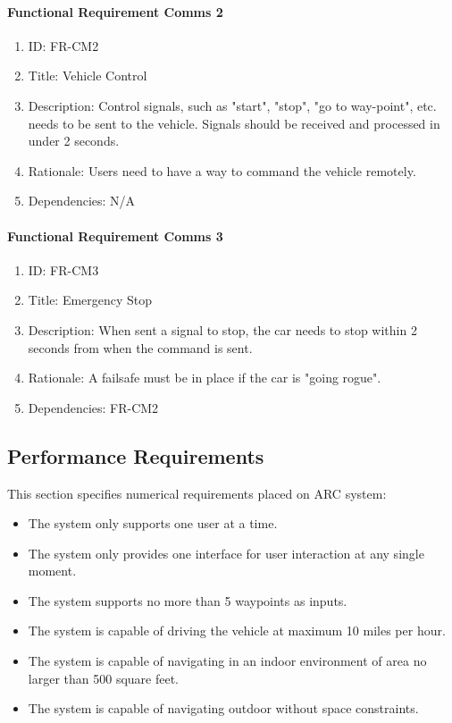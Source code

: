 \documentclass[compsoc,draftclsnofoot,onecolumn,10pt]{IEEEtran}
\begin{document}
	\paragraph{Functional Requirement Comms 2}
		\begin{enumerate}
			\item ID: FR-CM2
			\item Title: Vehicle Control
			\item Description: Control signals, such as "start", "stop", "go to way-point", etc. needs to be sent to the vehicle. Signals should be received and processed in under 2 seconds.
			\item Rationale: Users need to have a way to command the vehicle remotely.
			\item Dependencies: N/A
		\end{enumerate}
		
        \paragraph{Functional Requirement Comms 3}
        		\begin{enumerate}
        			\item ID: FR-CM3
        			\item Title: Emergency Stop
        			\item Description: When sent a signal to stop, the car needs to stop within 2 seconds from when the command is sent.
        			\item Rationale: A failsafe must be in place if the car is "going rogue".
        			\item Dependencies: FR-CM2
        		\end{enumerate}

\subsection{Performance Requirements}
This section specifies numerical requirements placed on ARC system:
\begin{itemize}
	\item The system only supports one user at a time.
	\item The system only provides one interface for user interaction at any single moment.
	\item The system supports no more than 5 waypoints as inputs.
	\item The system is capable of driving the vehicle at maximum 10 miles per hour.
	\item The system is capable of navigating in an indoor environment of area no larger than 500 square feet.
	\item The system is capable of navigating outdoor without space constraints.
\end{itemize}
\end{document}
